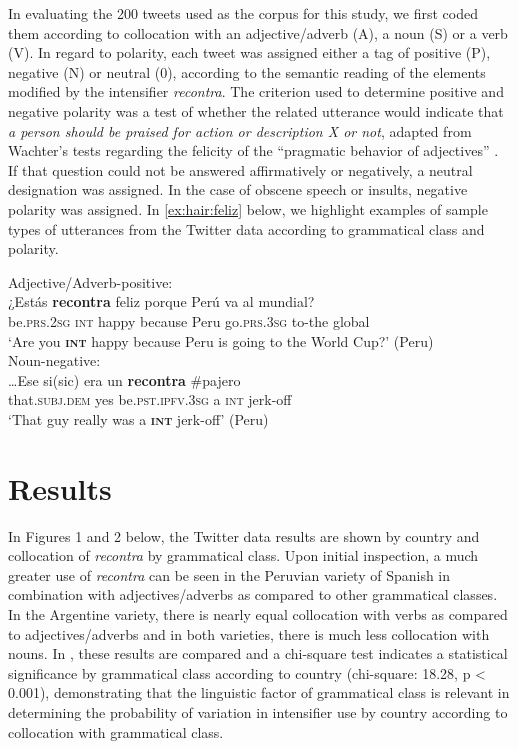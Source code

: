 \documentclass[output=paper,colorlinks,citecolor=brown,
]{langscibook}
\begin{document}
 In evaluating the 200 tweets used as the corpus for this study, we first coded them according to collocation with an adjective/adverb (A), a noun (S) or a verb (V). In regard to polarity, each tweet was assigned either a tag of positive (P), negative (N) or neutral (0), according to the semantic reading of the elements modified by the intensifier \textit{recontra}. The criterion used to determine positive and negative polarity was a test of whether the related utterance would indicate that \textit{a person should be praised for action or description X or not}, adapted from Wachter's tests regarding the felicity of the 
``pragmatic behavior of adjectives'' \citep[12]{Wachter2012}. If that question could not be answered affirmatively or negatively, a neutral designation was assigned. In the case of obscene speech or insults, negative polarity was assigned. In \ref{ex:hair:feliz} below, we highlight examples of sample  types of utterances from the Twitter data according to grammatical class and polarity. 


\begin{exe}
\ex\label{ex:hair:feliz}
\begin{xlist}
\ex 
Adjective/Adverb-positive:\\
\gll ¿Estás \textbf{recontra} feliz porque Perú va al mundial?\\ 
be.\textsc{prs.2sg} \textsc{int} happy because Peru go.\textsc{prs.3sg} to-the global\\
\glt `Are you \textbf{\textsc{int}} happy because Peru is going to the World Cup?' (Peru)\\
\ex
Noun-negative:\\
\gll \ldots Ese si(sic) era un \textbf{recontra} \#pajero\\
that.\textsc{subj.dem} yes be.\textsc{pst.ipfv.3sg} a \textsc{int} jerk-off\\
\glt `That guy really was a \textbf{\textsc{int}} jerk-off' (Peru)\\ 
\end{xlist}
\end{exe}


\section{Results}

In Figures 1 and 2 below, the Twitter data results are shown by country and collocation of \textit{recontra} by grammatical class. Upon initial inspection, a much greater use of \textit{recontra} can be seen in the Peruvian variety of Spanish in combination with adjectives/adverbs as compared to other grammatical classes. In the Argentine variety, there is nearly equal collocation with verbs as compared to adjectives/adverbs and in both varieties, there is much less collocation with nouns. In , these results are compared and a chi-square test indicates a statistical significance by grammatical class according to country (chi-square: 18.28, p < 0.001), demonstrating that the linguistic factor of grammatical class is relevant in determining the probability of variation in intensifier use by country according to collocation with grammatical class. 
\end{document}
